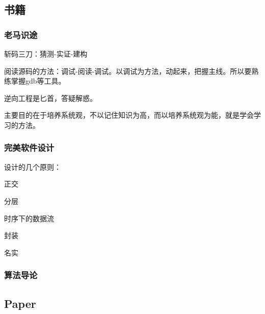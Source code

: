 \subsection{书籍}

\subsubsection{老马识途}

斩码三刀：猜测-实证-建构

阅读源码的方法：调试-阅读-调试。以调试为方法，动起来，把握主线。所以要熟练掌握gdb等工具。

逆向工程是匕首，答疑解惑。

主要目的在于培养系统观，不以记住知识为高，而以培养系统观为能，就是学会学习的方法。

\subsubsection{完美软件设计}

设计的几个原则：
\begin{enumbox}
\item 正交
\item 分层
\item 时序下的数据流
\item 封装
\item 名实
\end{enumbox}

\subsubsection{算法导论}

\subsection{Paper}
